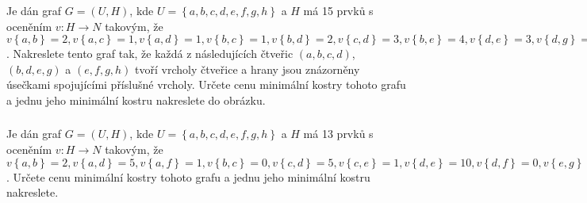\subsubsection{}
Je dán graf $G=(U,H)$, kde $U=\left \{a,b,c,d,e,f,g,h  \right \}$ a $H$ má 15
prvků s oceněním $v:H\rightarrow N$ takovým, že $v\left \{ a,b \right \}=2,
v\left \{ a,c \right \}=1, v\left \{ a,d \right \}=1, v\left \{ b,c \right \}=1,
v\left \{ b,d \right \}=2, v\left \{ c,d \right \}=3, v\left \{ b,e \right \}=4,
v\left \{ d,e \right \}=3, v\left \{ d,g \right \}=2, v\left \{ e,f \right \}=4,
v\left \{ e,g \right \}=3, v\left \{ e,h \right \}=2, v\left \{ f,g \right \}=3,
v\left \{ f,h \right \}=1, v\left \{ g,h \right \}=1$. Nakreslete tento graf
tak, že každá z následujících čtveřic $(a,b,c,d)$, $(b,d,e,g)$ a $(e,f,g,h)$ tvoří
vrcholy čtveřice a hrany  jsou znázorněny úsečkami spojujícími příslušné
vrcholy. Určete cenu minimální kostry tohoto grafu a jednu jeho minimální kostru
nakreslete do obrázku.
\subsubsection{}
Je dán graf $G=(U,H)$, kde $U=\left \{a,b,c,d,e,f,g,h  \right \}$ a $H$ má 13
prvků s oceněním $v:H\rightarrow N$ takovým, že $v\left \{ a,b \right \}=2,
v\left \{ a,d \right \}=5, v\left \{ a,f \right \}=1, v\left \{ b,c \right \}=0,
v\left \{ c,d \right \}=5, v\left \{ c,e \right \}=1, v\left \{ d,e \right \}=10,
v\left \{ d,f \right \}=0, v\left \{ e,g \right \}=3, v\left \{ e,h \right \}=3,
v\left \{ f,g \right \}=1, v\left \{ f,h \right \}=2, v\left \{ g,h \right \}=6 $. 
Určete cenu minimální kostry tohoto grafu a jednu jeho minimální kostru
nakreslete.
